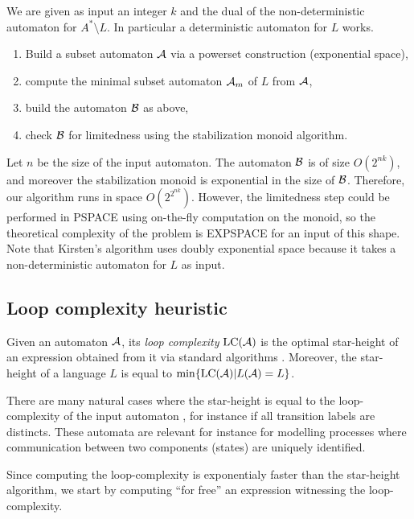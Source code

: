 \begin{framed}
We are given as input an integer $k$ and the dual of the non-deterministic automaton for $A^*\setminus L$. In particular a deterministic automaton for $L$ works.
\begin{enumerate}
	\item Build a subset automaton $\mathcal{A}$ via a powerset construction (exponential space),
	\item compute the minimal subset automaton $\mathcal{A}_m$ of $L$ from $\mathcal{A}$,
	\item build the automaton $\mathcal B$ as above,
	\item check $\mathcal B$ for limitedness using the stabilization monoid algorithm.
\end{enumerate}
\end{framed}

Let $n$ be the size of the input automaton.
The automaton $\mathcal B$ is of size $O(2^{nk})$, and moreover the stabilization monoid is exponential in the size of $\mathcal B$.
Therefore, our algorithm runs in space $O(2^{2^{nk}})$. However, the limitedness step could be performed in PSPACE using on-the-fly computation on the monoid, 
so the theoretical complexity of the problem is EXPSPACE for an input of this shape. 
Note that Kirsten's algorithm uses doubly exponential space because it takes a non-deterministic automaton for $L$ as input.

\subsection{Loop complexity heuristic}

\newcommand{\lc}{\mathrm{LC}}

Given an automaton $\mathcal{A}$, its \emph{loop complexity} $\lc(\A)$ is the optimal star-height of an expression obtained from it via standard algorithms \cite{Eggan63}. Moreover, the star-height of a language $L$ is equal to $\min\{\lc(\A)| L(\A)=L\}$.

There are many natural cases where the star-height is equal to the loop-complexity of the input automaton \cite{Cohen70}, for instance if all transition labels are distincts. These automata are relevant for instance for modelling processes where communication between two components (states) are uniquely identified. 

Since computing the loop-complexity is exponentialy faster than the star-height algorithm, we start by computing ``for free'' an expression witnessing the loop-complexity.

